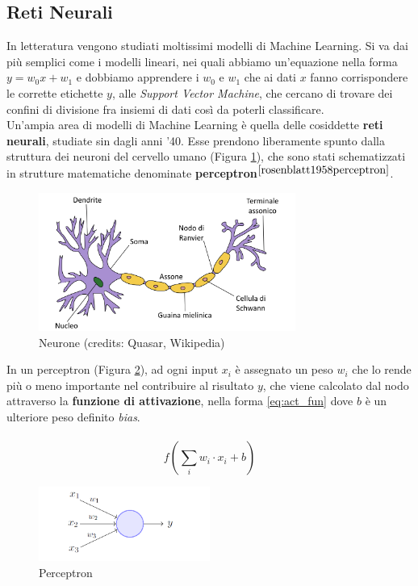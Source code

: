 \subsection{Reti Neurali} In letteratura vengono studiati moltissimi modelli di Machine Learning. Si va dai più semplici come i modelli lineari, nei quali abbiamo un'equazione nella forma $y = w_0x + w_1$ e dobbiamo apprendere i $w_0$ e $w_1$ che ai dati $x$ fanno corrispondere le corrette etichette $y$, alle \textit{Support Vector Machine}, che cercano di trovare dei confini di divisione fra insiemi di dati così da poterli classificare.\\
Un'ampia area di modelli di Machine Learning è quella delle cosiddette \textbf{reti neurali}, studiate sin dagli anni '40. Esse prendono liberamente spunto dalla struttura dei neuroni del cervello umano (Figura \ref{fig:neurone}), che sono stati schematizzati in strutture matematiche denominate \textbf{perceptron}$^{\cite{rosenblatt1958perceptron}}$.
\begin{figure}[h]
	\begin{center}
		\includegraphics[width=0.75\textwidth]{img/neurone.png}
		\caption{Neurone (credits: Quasar, Wikipedia)}
		\label{fig:neurone}
	\end{center}
\end{figure}
In un perceptron (Figura \ref{fig:perceptron}), ad ogni input $x_i$ è assegnato un peso $w_i$ che lo rende più o meno importante nel contribuire al risultato $y$, che viene calcolato dal nodo attraverso la \textbf{funzione di attivazione}, nella forma \ref{eq:act_fun} dove $b$ è un ulteriore peso definito \textit{bias}.\\\\
\begin{equation}\label{eq:act_fun}
f\left(\sum_i w_i\cdot x_i + b\right)
\end{equation}
\begin{figure}[h]
	\begin{center}
		\includegraphics[width=0.5\textwidth]{img/perceptron.png}
		\caption{Perceptron}
		\label{fig:perceptron}
	\end{center}
\end{figure}
